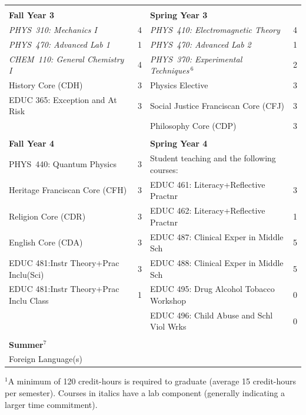 \documentclass[12pt]{article}
\begin{document}
\begin{table}[h!]
\begin{center}
{\begin{tabular*}{0.9\textwidth}{@{\extracolsep{\fill}}lclc}
 & \\
{\Large \textbf{Fall Year 3}} & & {\Large \textbf{Spring Year 3}} & \\
\hline
{\em PHYS~310: Mechanics I}         & 4 & {\em PHYS~410: Electromagnetic Theory}  & 4 \\
{\em PHYS~470: Advanced Lab 1}  & 1 & {\em PHYS~470: Advanced Lab 2} & 1 \\
{\em CHEM~110: General Chemistry I} & 4 & {\em PHYS~370: Experimental Techniques}\,$^{6}$ & 2 \\
History Core (CDH)                  & 3 & Physics Elective           & 3 \\
EDUC 365: Exception and At Risk  &3 & Social Justice Franciscan Core (CFJ) & 3 \\
					&	&Philosophy Core (CDP)             & 3 \\
 & \\
{\Large \textbf{Fall Year 4}} & & {\Large \textbf{Spring Year 4}} & \\
\hline
PHYS~440: Quantum Physics      & 3 & Student teaching and the following courses:         \\
Heritage Franciscan Core (CFH) & 3 & EDUC 461: Literacy+Reflective Practnr			&3\\
Religion Core (CDR)                       & 3 & EDUC 462: Literacy+Reflective Practnr              & 1 \\
English Core (CDA) 			  & 3  & EDUC 487: Clinical Exper in Middle Sch			&5\\
EDUC 481:Instr Theory+Prac Inclu(Sci)    & 3 &EDUC 488: Clinical Exper in Middle Sch     & 5 \\
EDUC 481:Instr Theory+Prac Inclu Class     & 1 &EDUC 495: Drug Alcohol Tobacco Workshop  & 0 \\
						& &EDUC 496: Child Abuse and Schl Viol Wrks                 & 0 \\

 & \\
{\Large \textbf{Summer$^{7}$}} \\
\hline
Foreign Language(s)
 & \\
\end{tabular*}
}
\end{center}
\end{table}

\vspace*{-4mm}
\hspace{0.1in}$^{1}$A minimum of 120 credit-hours is required to
graduate (average 15 credit-hours per semester).  \hspace*{0.42in}Courses in italics have a lab
component (generally indicating a larger time commitment). 
\end{document}
